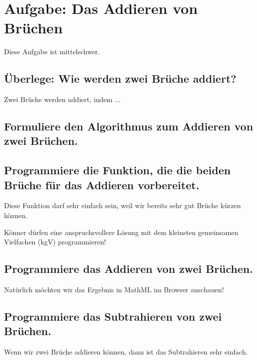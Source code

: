 \section{Aufgabe: Das Addieren von Brüchen}

Diese Aufgabe ist mittelschwer.

\subsection*{Überlege: Wie werden zwei Brüche addiert?}

Zwei Brüche werden addiert, indem $\dots$

\subsection*{Formuliere den Algorithmus zum Addieren von zwei Brüchen.}

\subsection*{Programmiere die Funktion, die die beiden Brüche für das Addieren vorbereitet.}

Diese Funktion darf sehr einfach sein, weil wir bereits sehr gut Brüche kürzen können.

Könner dürfen eine anspruchsvollere Lösung mit dem kleinsten gemeinsamen Vielfachen (kgV) programmieren!

\subsection*{Programmiere das Addieren von zwei Brüchen.}

Natürlich möchten wir das Ergebnis in MathML im Browser anschauen!

\subsection*{Programmiere das Subtrahieren von zwei Brüchen.}

Wenn wir zwei Brüche addieren können, dann ist das Subtrahieren sehr einfach.